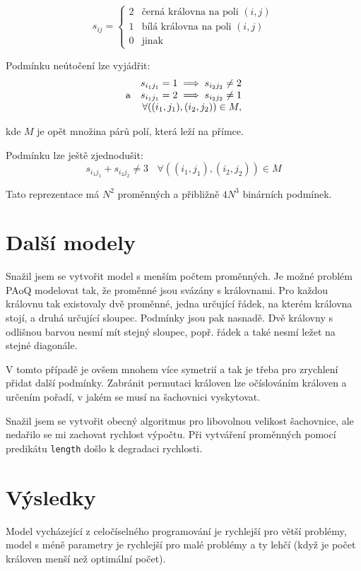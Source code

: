\documentclass[11pt]{article}
\begin{document}
$$
    s_{ij} = \begin{cases}
        2 & \text{černá královna na poli $(i,j)$}\\
        1 & \text{bílá královna na poli $(i,j)$}\\
        0 & \text{jinak}
    \end{cases}
$$

Podmínku neútočení lze vyjádřit:
$$
\begin{array}[b]{rr}
    & s_{i_1 j_1} = 1 \implies s_{i_2 j_2} \ne 2 \\
    \text{a} & s_{i_1 j_1} = 2 \implies s_{i_2 j_2} \ne 1 \\
             & \forall ((i_1, j_1), (i_2, j_2)) \in M,
\end{array}
$$

kde $M$ je opět množina párů polí, která leží na přímce.

Podmínku lze ještě zjednodušit:
$$ s_{i_1 j_1} + s_{i_2 j_2} \ne 3 ~~~~ \forall ((i_1, j_1), (i_2, j_2)) \in M$$

Tato reprezentace má $N^2$ proměnných a přibližně $4N^3$ binárních podmínek.

\section{Další modely}

Snažil jsem se vytvořit model s menším počtem proměnných. Je možné problém PAoQ
modelovat tak, že proměnné jsou svázány s královnami. Pro každou královnu tak
existovaly dvě proměnné, jedna určující řádek, na kterém královna stojí, a druhá
určující sloupec. Podmínky jsou pak nasnadě. Dvě královny s odlišnou barvou
nesmí mít stejný sloupec, popř. řádek a také nesmí ležet na stejné diagonále.

V tomto případě je ovšem mnohem více symetrií a tak je třeba pro zrychlení
přidat další podmínky. Zabránit permutaci královen lze očíslováním královen a
určením pořadí, v jakém se musí na šachovnici vyskytovat.

Snažil jsem se vytvořit obecný algoritmus pro libovolnou velikost šachovnice,
ale nedařilo se mi zachovat rychlost výpočtu. Při vytváření proměnných pomocí
predikátu {\tt length} došlo k degradaci rychlosti.

\section{Výsledky}

Model vycházející z celočíselného programování je rychlejší pro větší problémy, model s méně parametry je rychlejší pro malé problémy a ty lehčí (když je počet královen menší než optimální počet).
\end{document}
